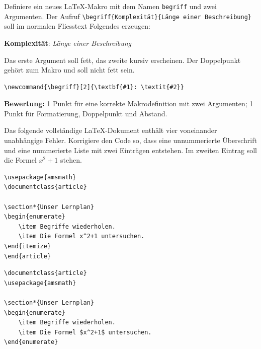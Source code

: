 \begin{questions}

	\question[2]
	Definiere ein neues \LaTeX-Makro mit dem Namen
	\lstinline[style=LaTeX]|begriff| und zwei Argumenten. Der Aufruf
	\lstinline[style=LaTeX]|\begriff{Komplexität}{Länge einer Beschreibung}|
	soll im normalen Fliesstext Folgendes erzeugen:
	\begin{center}
		\textbf{Komplexität}: \textit{Länge einer Beschreibung}
	\end{center}
	Das erste Argument soll fett, das zweite kursiv erscheinen. Der Doppelpunkt gehört zum Makro und soll nicht fett sein.
	\begin{solution}
		\begin{lstlisting}[style=LaTeX]
\newcommand{\begriff}[2]{\textbf{#1}: \textit{#2}}
		\end{lstlisting}
		\textbf{Bewertung:} 1 Punkt für eine korrekte Makrodefinition mit zwei Argumenten; 1 Punkt für Formatierung, Doppelpunkt und Abstand.
	\end{solution}

	\question[2]
	Das folgende vollständige \LaTeX-Dokument enthält vier voneinander unabhängige Fehler. Korrigiere den Code so, dass eine unnummerierte Überschrift und eine nummerierte Liste mit zwei Einträgen entstehen. Im zweiten Eintrag soll die Formel $x^2+1$ stehen.
	\begin{lstlisting}[style=LaTeX]
\usepackage{amsmath}
\documentclass{article}

\section*{Unser Lernplan}
\begin{enumerate}
    \item Begriffe wiederholen.
    \item Die Formel x^2+1 untersuchen.
\end{itemize}
\end{article}
	\end{lstlisting}
	\begin{solution}
		\begin{lstlisting}[style=LaTeX]
\documentclass{article}
\usepackage{amsmath}

\section*{Unser Lernplan}
\begin{enumerate}
    \item Begriffe wiederholen.
    \item Die Formel $x^2+1$ untersuchen.
\end{enumerate}


\end{lstlisting}
\end{solution}
\end{questions}
